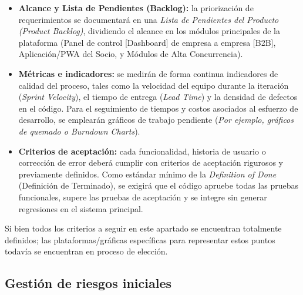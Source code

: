 \begin{itemize}
    \item \textbf{Alcance y Lista de Pendientes (Backlog):} la priorización de requerimientos se documentará en una \textit{Lista de Pendientes del Producto (Product Backlog)}, dividiendo el alcance en los módulos principales de la plataforma (Panel de control [Dashboard] de empresa a empresa [B2B], Aplicación/PWA del Socio, y Módulos de Alta Concurrencia).
    \item \textbf{Métricas e indicadores:} se medirán de forma continua indicadores de calidad del proceso, tales como la velocidad del equipo durante la iteración (\textit{Sprint Velocity}), el tiempo de entrega (\textit{Lead Time}) y la densidad de defectos en el código. Para el seguimiento de tiempos y costos asociados al esfuerzo de desarrollo, se emplearán gráficos de trabajo pendiente (\textit{Por ejemplo, gráficos de quemado o Burndown Charts}).
    \item \textbf{Criterios de aceptación:} cada funcionalidad, historia de usuario o corrección de error deberá cumplir con criterios de aceptación rigurosos y previamente definidos. Como estándar mínimo de la \textit{Definition of Done} (Definición de Terminado), se exigirá que el código apruebe todas las pruebas funcionales, supere las pruebas de aceptación y se integre sin generar regresiones en el sistema principal.
\end{itemize}

Si bien todos los criterios a seguir en este apartado se encuentran totalmente definidos; las plataformas/gráficas específicas para representar estos puntos todavía se encuentran en proceso de elección.

\subsection{Gestión de riesgos iniciales}

